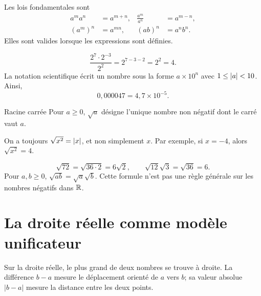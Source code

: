 Les lois fondamentales sont
\begin{align*}
a^m a^n&=a^{m+n},&\frac{a^m}{a^n}&=a^{m-n},\\
(a^m)^n&=a^{mn},&(ab)^n&=a^n b^n.
\end{align*}
Elles sont valides lorsque les expressions sont définies.

\begin{examplebox}
\[
\frac{2^7\cdot2^{-3}}{2^2}=2^{7-3-2}=2^2=4.
\]
La notation scientifique écrit un nombre sous la forme $a\times10^n$ avec $1\le\left\lvert a\right\rvert<10$. Ainsi,
\[
0{,}000047=4{,}7\times10^{-5}.
\]
\end{examplebox}

\begin{definition}{Racine carrée}{}
Pour $a\ge0$, $\sqrt a$ désigne l'unique nombre non négatif dont le carré vaut $a$.
\end{definition}

\begin{warningbox}
On a toujours $\sqrt{x^2}=\left\lvert x\right\rvert$, et non simplement $x$. Par exemple, si $x=-4$, alors $\sqrt{x^2}=4$.
\end{warningbox}

\begin{examplebox}
\[
\sqrt{72}=\sqrt{36\cdot2}=6\sqrt2,
\qquad
\sqrt{12}\sqrt3=\sqrt{36}=6.
\]
Pour $a,b\ge0$, $\sqrt{ab}=\sqrt a\sqrt b$. Cette formule n'est pas une règle générale sur les nombres négatifs dans $\mathbb{R}$.
\end{examplebox}


\section{La droite réelle comme modèle unificateur}
\label{manual:section:01.05}

\begin{visualbox}
Sur la droite réelle, le plus grand de deux nombres se trouve à droite. La différence $b-a$ mesure le déplacement orienté de $a$ vers $b$; sa valeur absolue $|b-a|$ mesure la distance entre les deux points.
\end{visualbox}

\begin{center}
\end{center}

